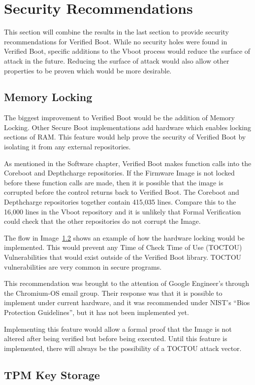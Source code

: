 \chapter{Security Recommendations}

This section will combine the results in the last section to provide security
recommendations for Verified Boot.
While no security holes were found in Verified Boot, specific additions to the
Vboot process would reduce the surface of attack in the future.
Reducing the surface of attack would also allow other properties to be proven
which would be more desirable.

\section{Memory Locking}

The biggest improvement to Verified Boot would be the addition of Memory
Locking.
Other Secure Boot implementations add hardware which enables locking sections
of RAM\cite{elane}.
This feature would help prove the security of Verified Boot by isolating it from
any external repositories.

As mentioned in the Software chapter, Verified Boot makes function calls into
the Coreboot and Depthcharge repositories.
If the Firmware Image is not locked before these function calls are made, then
it is possible that the image is corrupted before the control returns back to
Verified Boot.
The Coreboot and Depthcharge repositories together contain 415,035 lines. 
Compare this to the 16,000 lines in the Vboot repository and it is unlikely that
Formal Verification could check that the other repositories do not corrupt the
Image.


The flow in Image~\ref{} shows an example of how the hardware locking would be
implemented.
This would prevent any Time of Check Time of Use (TOCTOU) Vulnerabilities that
would exist outside of the Verified Boot library.
TOCTOU vulnerabilities are very common in secure programs\cite{tpm-toctou}.

This recommendation was brought to the attention of Google Engineer's through
the Chromium-OS email group.
Their response was that it is possible to implement under current hardware, and
it was recommended under NIST's ``Bios Protection Guidelines'', but it has not
been implemented yet.

Implementing this feature would allow a formal proof that the Image is not
altered after being verified but before being executed. 
Until this feature is implemented, there will always be the possibility of a
TOCTOU attack vector.

\section{TPM Key Storage}

